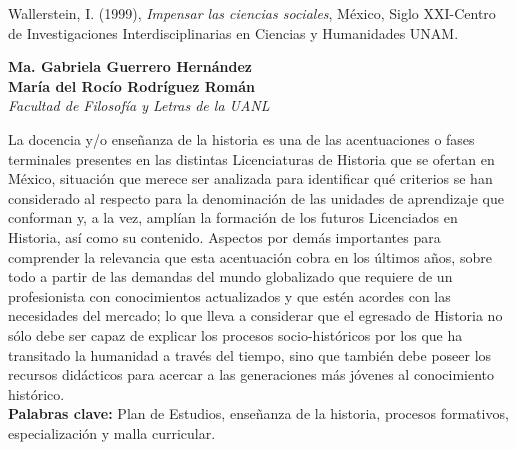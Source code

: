 Wallerstein, I\@. (1999), \textit{Impensar las ciencias sociales}, México, Siglo XXI-Centro de Investigaciones Interdisciplinarias en Ciencias y Humanidades UNAM\@.

\thispagestyle{empty}	
{ \par}

\bigskip
\begin{center}
{\bfseries  Ma. Gabriela Guerrero Hernández\\
María del Rocío Rodríguez Román}\\
{\itshape{} Facultad de Filosofía y Letras de la UANL\/}
\end{center}


\bigskip
{}

La docencia y\slash{}o enseñanza de la historia es una de las 
acentuaciones o fases terminales presentes en las distintas 
Licenciaturas de Historia que se ofertan en México, situación que 
merece ser analizada para identificar qué criterios se han considerado 
al respecto para la denominación de las unidades de aprendizaje que 
conforman y, a la vez, amplían la formación de los futuros Licenciados 
en Historia, así como su contenido. Aspectos por demás importantes para 
comprender la relevancia que esta acentuación cobra en los últimos 
años, sobre todo a partir de las demandas del mundo globalizado que 
requiere de un profesionista con conocimientos actualizados y que estén 
acordes con las necesidades del mercado; lo que lleva a considerar que 
el egresado de Historia no sólo debe ser capaz de explicar los procesos 
socio-históricos por los que ha transitado la humanidad a través del 
tiempo, sino que también debe poseer los recursos didácticos  para 
acercar a las generaciones más jóvenes al conocimiento histórico.\\ 
{\bfseries Palabras clave:} Plan de Estudios, enseñanza de la historia, 
procesos formativos, especialización y malla curricular.

